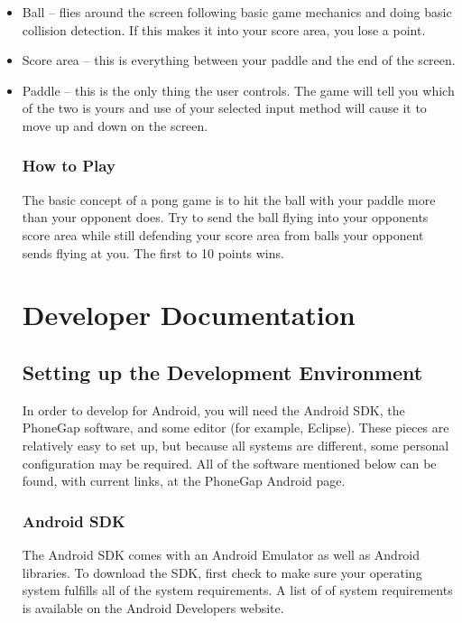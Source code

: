 \documentclass[12pt]{article}
\begin{document}
\begin{itemize}
\item Ball – flies around the screen following basic game mechanics and doing basic collision detection. If this makes it into your score area, you lose a point.
\item Score area – this is everything between your paddle and the end of the screen. 
\item Paddle – this is the only thing the user controls. The game will tell you which of the two is yours and use of your selected input method will cause it to move up and down on the screen. 
\subsubsection{How to Play}
The basic concept of a pong game is to hit the ball with your paddle more than your opponent does. Try to send the ball flying into your opponents score area while still defending your score area from balls your opponent sends flying at you. The first to 10 points wins.




\section{Developer Documentation}

\label{sec:developerdocumentation}

\subsection{Setting up the Development Environment}
In order to develop for Android, you will need the Android SDK, the PhoneGap software, and some editor (for example, Eclipse).  These pieces are relatively easy to set up, but because all systems are different, some personal configuration may be required.  All of the software mentioned below can be found, with current links, at the PhoneGap Android page\cite{PhoneGap-Android}.  

\subsubsection{Android SDK}
The Android SDK comes with an Android Emulator as well as Android libraries.
To download the SDK, first check to make sure your operating system fulfills all of the system requirements.  A list of of system requirements is available on the Android Developers website\cite{AndroidSDK-SystemRequirements}.


\end{itemize}
\end{document}
